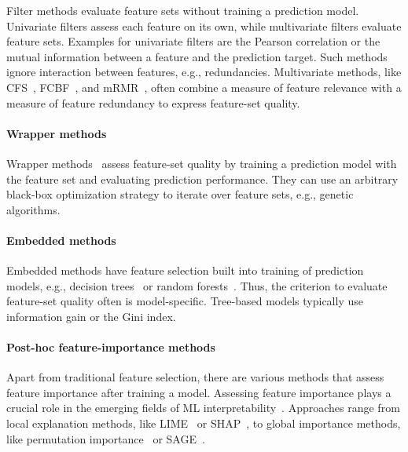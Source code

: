 \documentclass[conference]{IEEEtran}
\theoremstyle{definition}
\begin{document}
Filter methods evaluate feature sets without training a prediction model.
Univariate filters assess each feature on its own, while multivariate filters evaluate feature sets.
Examples for univariate filters are the Pearson correlation or the mutual information between a feature and the prediction target.
Such methods ignore interaction between features, e.g., redundancies.
Multivariate methods, like CFS~\cite{hall1999correlation}, FCBF~\cite{yu2003feature}, and mRMR~\cite{peng2005feature}, often combine a measure of feature relevance with a measure of feature redundancy to express feature-set quality.

\paragraph{Wrapper methods}

Wrapper methods~\cite{kohavi1997wrappers} assess feature-set quality by training a prediction model with the feature set and evaluating prediction performance.
They can use an arbitrary black-box optimization strategy to iterate over feature sets, e.g., genetic algorithms.

\paragraph{Embedded methods}

Embedded methods have feature selection built into training of prediction models, e.g., decision trees~\cite{breiman1984classification} or random forests~\cite{breiman2001random}.
Thus, the criterion to evaluate feature-set quality often is model-specific.
Tree-based models typically use information gain or the Gini index.

\paragraph{Post-hoc feature-importance methods}

Apart from traditional feature selection, there are various methods that assess feature importance after training a model.
Assessing feature importance plays a crucial role in the emerging fields of ML interpretability~\cite{carvalho2019machine}.
Approaches range from local explanation methods, like LIME~\cite{ribeiro2016should} or SHAP~\cite{lundberg2017unified}, to global importance methods, like permutation importance~\cite{breiman2001random} or SAGE~\cite{covert2020understanding}.
\end{document}
